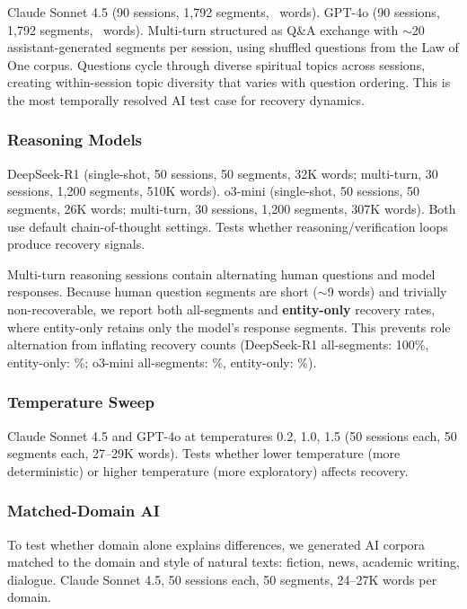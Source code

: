 \documentclass[11pt]{article}
\begin{document}
Claude Sonnet 4.5 (90 sessions, 1,792 segments, \nMultiturnClaudeWords\ words). GPT-4o (90 sessions, 1,792 segments, \nMultiturnGPTWords\ words). Multi-turn structured as Q\&A exchange with $\sim$20 assistant-generated segments per session, using shuffled questions from the Law of One corpus. Questions cycle through diverse spiritual topics across sessions, creating within-session topic diversity that varies with question ordering. This is the most temporally resolved AI test case for recovery dynamics.

\subsubsection{Reasoning Models}

DeepSeek-R1 (single-shot, 50 sessions, 50 segments, 32K words; multi-turn, 30 sessions, 1,200 segments, 510K words). o3-mini (single-shot, 50 sessions, 50 segments, 26K words; multi-turn, 30 sessions, 1,200 segments, 307K words). Both use default chain-of-thought settings. Tests whether reasoning/verification loops produce recovery signals.

Multi-turn reasoning sessions contain alternating human questions and model responses. Because human question segments are short ($\sim$9 words) and trivially non-recoverable, we report both all-segments and \textbf{entity-only} recovery rates, where entity-only retains only the model's response segments. This prevents role alternation from inflating recovery counts (DeepSeek-R1 all-segments: 100\%, entity-only: \recReasoningDSMTEntity\%; o3-mini all-segments: \recReasoningOiiiMTAll\%, entity-only: \recReasoningOiiiEntity\%).

\subsubsection{Temperature Sweep}

Claude Sonnet 4.5 and GPT-4o at temperatures 0.2, 1.0, 1.5 (50 sessions each, 50 segments each, 27--29K words). Tests whether lower temperature (more deterministic) or higher temperature (more exploratory) affects recovery.

\subsubsection{Matched-Domain AI}

To test whether domain alone explains differences, we generated AI corpora matched to the domain and style of natural texts: fiction, news, academic writing, dialogue. Claude Sonnet 4.5, 50 sessions each, 50 segments, 24--27K words per domain.
\end{document}
